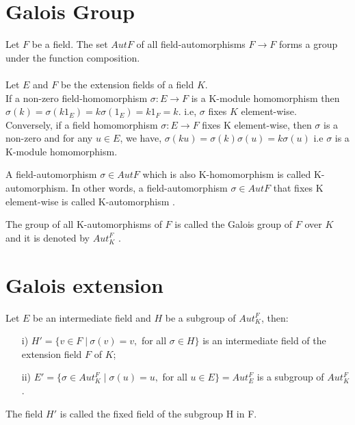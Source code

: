 \section{Galois Group}
Let \(F\) be a field. The set \(AutF\) of all field-automorphisms \(F \rightarrow F \) forms a group under the function composition.\\ \\
Let \(E\) and \(F\) be the extension fields of a field \(K\).\\
If a non-zero field-homomorphism \(\sigma : E \rightarrow F\) is a K-module homomorphism then\\
\(\sigma(k)=\sigma(k1_E)=k\sigma(1_E)=k1_F=k\).\hspace{7mm}
i.e, \(\sigma\) fixes \(K\) element-wise.\\
Conversely, if a field homomorphism \(\sigma : E \rightarrow F\) fixes K element-wise, then \(\sigma\) is a non-zero and for any \(u \in E\), we have, \(\sigma(ku)=\sigma(k)\sigma(u)=k\sigma(u)\)
i.e \(\sigma\) is a K-module homomorphism.
\begin{definition}
  A field-automorphism \(\sigma \in Aut F\) which is also K-homomorphism is called K-automorphism. In other words, a field-automorphism \(\sigma \in Aut F\) that fixes K element-wise is called K-automorphism \cite{hunger}.
\end{definition}

\begin{definition}
  The group of all K-automorphisms of \(F\) is called the Galois group of \(F\) over \(K\) and it is denoted by \(Aut_K^F\) \cite{hunger}.
\end{definition}

\section{Galois extension}
Let \(E\) be an intermediate field and \(H\) be a subgroup of \(Aut_K^F\), then:
\begin{enumerate}
\item[i)] \(H' = \{v \in F \; | \: \sigma(v)=v,\) for all \(\sigma \in H \}\) is an intermediate field of the extension field \(F\) of \(K\);
\item[ii)] \(E' = \{\sigma \in Aut_K^F \; | \; \sigma(u)=u,\) for all \(u \in E\}=Aut_E^F\) is a subgroup of \(Aut_K^F\).
\end{enumerate}

The field \(H'\) is called the fixed field of the subgroup H in F.

